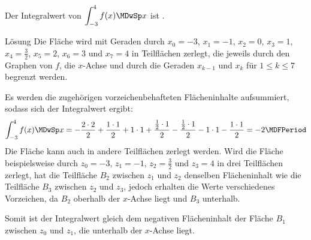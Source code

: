 \begin{MExercises}
\begin{MExercise}
Der Integralwert von
$\displaystyle \int_{-3}^{4} f(x) \MDwSp x$
ist .

\begin{MHint}{Lösung}
Die Fläche wird mit Geraden durch $x_0 = -3$, $x_1 = -1$, $x_2 = 0$, $x_3 = 1$,
$x_4 = \frac{3}{2}$, $x_5 = 2$, $x_6 = 3$ und $x_7 = 4$ in Teilflächen zerlegt,
die jeweils durch den Graphen von $f$, die $x$-Achse und durch die Geraden 
$x_{k-1}$ und $x_k$ für $1 \leq k \leq 7$ begrenzt werden.

Es werden die zugehörigen vorzeichenbehafteten Flächeninhalte aufsummiert, 
sodass sich der Integralwert ergibt:
\[
\int_{-3}^{4} f(x) \MDwSp x %
= -\frac{2 \cdot 2}{2} + \frac{1 \cdot 1}{2} + 1 \cdot 1 %
 + \frac{\frac{1}{2} \cdot 1}{2}
 - \frac{\frac{1}{2} \cdot 1}{2}
 - 1 \cdot 1 - \frac{1 \cdot 1}{2} %
= -2\MDFPeriod %
\]
Die Fläche kann auch in andere Teilflächen zerlegt werden. Wird die Fläche
beispielsweise durch $z_0 = -3$, $z_1 = -1$, $z_2 = \frac{3}{2}$ und $z_3 = 4$ 
in drei Teilflächen zerlegt, hat die Teilfläche $B_2$ zwischen $z_1$ und $z_2$ 
denselben Flächeninhalt wie die Teilfläche $B_3$ zwischen $z_2$ und $z_3$, 
jedoch erhalten die Werte verschiedenes Vorzeichen, da $B_2$ oberhalb der 
$x$-Achse liegt und $B_3$ unterhalb. 
\begin{center}
\end{center}
Somit ist der Integralwert gleich dem negativen Flächeninhalt der Fläche 
$B_1$ zwischen $z_0$ und $z_1$, die unterhalb der $x$-Achse liegt.
\end{MHint}
\end{MExercise}



\end{MExercises}
